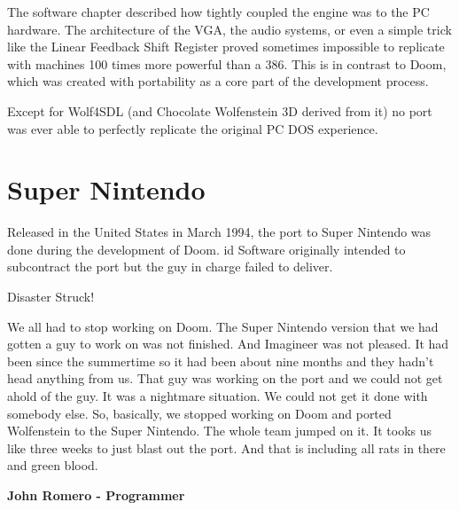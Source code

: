 \documentclass[book.tex]{subfiles}
\begin{document}
The software chapter described how tightly coupled the engine was to the PC hardware. The architecture of the VGA,  the audio systems, or even a simple trick like the Linear Feedback Shift Register proved sometimes impossible to replicate with machines 100 times more powerful than a 386. This is in contrast to Doom, which was created with portability as a core part of the development process.\\
\par
Except for Wolf4SDL (and Chocolate Wolfenstein 3D derived from it) no port was ever able to perfectly replicate the original PC DOS experience. 


\section{Super Nintendo}
Released in the United States in March 1994, the port to Super Nintendo was done during the development of Doom. id Software originally intended to subcontract the port but the guy in charge failed to deliver.\\
\par
 \begin{fancyquotes}
Disaster Struck!\\
\par
We all had to stop working on Doom. The Super Nintendo version that we had gotten a guy to work on was not finished. And Imagineer was not pleased. It had been since the summertime so it had been about nine months and they hadn't head anything from us. That guy was working on the port and we could not get ahold of the guy. It was a nightmare situation. We could not get it done with somebody else. So, basically, we stopped working on Doom and ported Wolfenstein to the Super Nintendo. The whole team jumped on it. It tooks us like three weeks to just blast out the port. And that is including all rats in there and green blood.\\
\par
\textbf{John Romero - Programmer}
\end{fancyquotes}

\par
\begin{figure}[H]
\centering
 \end{figure}
 \par
\end{document}
